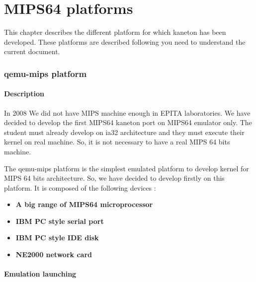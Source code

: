 %
%
%
%
%
%

%
%

\chapter{MIPS64 platforms}

This chapter describes the different platform for which kaneton has been developed. These platforms are described following you need to understand the current document.


\subsection{qemu-mips platform}

\subsubsection{Description}

In 2008 We did not have MIPS machine enough in EPITA laboratories. We have decided to develop the first MIPS64 kaneton
port on MIPS64 emulator only. The student must already develop on ia32 architecture and they must execute their kernel
on real machine. So, it is not necessary to have a real MIPS 64 bits machine.

The qemu-mips platform is the simplest emulated platform to develop kernel for MIPS 64 bits architecture. So, we have decided to develop firstly on this platform. It is composed of the following devices :

\begin{itemize}
  \item
    \textbf{A big range of MIPS64 microprocessor}
  \item
    \textbf{IBM PC style serial port}
  \item
    \textbf{IBM PC style IDE disk}
  \item
    \textbf{NE2000 network card}
\end{itemize}
 
\subsubsection{Emulation launching}

